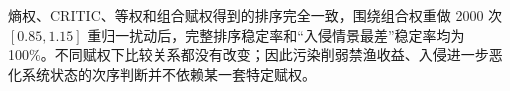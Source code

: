 熵权、CRITIC、等权和组合赋权得到的排序完全一致，围绕组合权重做 2000 次 $[0.85,1.15]$ 重归一扰动后，完整排序稳定率和“入侵情景最差”稳定率均为 100\%。不同赋权下比较关系都没有改变；因此污染削弱禁渔收益、入侵进一步恶化系统状态的次序判断并不依赖某一套特定赋权。
